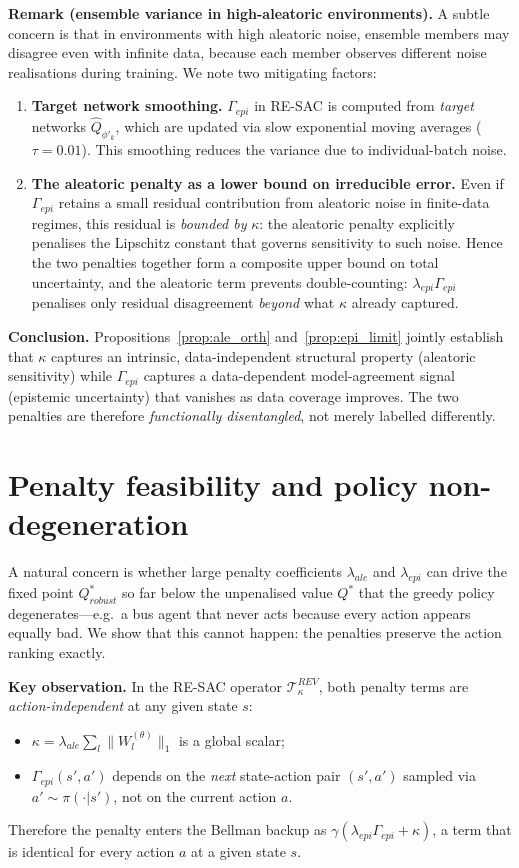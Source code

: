 \medskip
\noindent\textbf{Remark (ensemble variance in high-aleatoric environments).}
A subtle concern is that in environments with high aleatoric noise, ensemble
members may disagree even with infinite data, because each member observes
different noise realisations during training.  We note two mitigating factors:
\begin{enumerate}
    \item \textbf{Target network smoothing.} $\Gamma_{epi}$ in RE-SAC is
    computed from \emph{target} networks $\hat{Q}_{\phi'_k}$, which are
    updated via slow exponential moving averages ($\tau=0.01$).  This
    smoothing reduces the variance due to individual-batch noise.
    \item \textbf{The aleatoric penalty as a lower bound on irreducible error.}
    Even if $\Gamma_{epi}$ retains a small residual contribution from
    aleatoric noise in finite-data regimes, this residual is \emph{bounded by}
    $\kappa$: the aleatoric penalty explicitly penalises the Lipschitz constant
    that governs sensitivity to such noise.  Hence the two penalties together
    form a composite upper bound on total uncertainty, and the aleatoric
    term prevents double-counting: $\lambda_{epi}\Gamma_{epi}$ penalises only
    residual disagreement \emph{beyond} what $\kappa$ already captured.
\end{enumerate}
\textbf{Conclusion.}
Propositions~\ref{prop:ale_orth} and~\ref{prop:epi_limit} jointly establish
that $\kappa$ captures an intrinsic, data-independent structural property
(aleatoric sensitivity) while $\Gamma_{epi}$ captures a data-dependent
model-agreement signal (epistemic uncertainty) that vanishes as data coverage
improves.  The two penalties are therefore \emph{functionally disentangled},
not merely labelled differently.


\section{Penalty feasibility and policy non-degeneration}
\label{app:nondegen}

A natural concern is whether large penalty coefficients $\lambda_{ale}$ and
$\lambda_{epi}$ can drive the fixed point $Q^*_{robust}$ so far below the
unpenalised value $Q^*$ that the greedy policy degenerates---e.g.\ a bus agent
that never acts because every action appears equally bad.  We show that this
cannot happen: the penalties preserve the action ranking exactly.

\medskip
\noindent\textbf{Key observation.}
In the RE-SAC operator $\mathcal{T}^{REV}_\kappa$, both penalty terms are
\emph{action-independent} at any given state $s$:
\begin{itemize}
    \item $\kappa = \lambda_{ale}\sum_l\|W_l^{(\theta)}\|_1$ is a global scalar;
    \item $\Gamma_{epi}(s',a')$ depends on the \emph{next} state-action pair
    $(s',a')$ sampled via $a'\sim\pi(\cdot|s')$, not on the current action $a$.
\end{itemize}
Therefore the penalty enters the Bellman backup as
$\gamma(\lambda_{epi}\Gamma_{epi}+\kappa)$, a term that is identical for
every action $a$ at a given state $s$.

